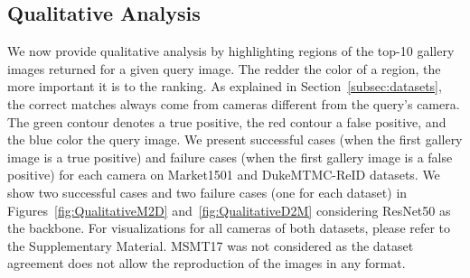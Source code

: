 \documentclass[journal]{IEEEtran}
\begin{document}
\subsection{Qualitative Analysis}

We now provide qualitative analysis by highlighting regions of the top-10 gallery images returned for a given query image. The redder the color of a region, the more important it is to the ranking. As explained in Section~\ref{subsec:datasets}, the correct matches always come from cameras different from the query’s camera. The green contour denotes a true positive, the red contour a false positive, and the blue color the query image. We present successful cases (when the first gallery image is a true positive) and failure cases (when the first gallery image is a false positive) for each camera on Market1501 and DukeMTMC-ReID datasets. We show two successful cases and two failure cases (one for each dataset) in Figures~\ref{fig:QualitativeM2D} and~\ref{fig:QualitativeD2M} considering ResNet50 as the backbone. For visualizations for all cameras of both datasets, please refer to the Supplementary Material. MSMT17 was not considered as the dataset agreement does not allow the reproduction of the images in any format.

\begin{figure*}[ht]
\centering
{}
\hfil
{}
\caption{The most activated regions in the gallery image given a query on DukeMTMCReID (Market $\rightarrow$ Duke scenario) for ResNet50. (a) Successful match; (b) Failure case.}
\label{fig:QualitativeM2D}
\end{figure*}

\begin{figure*}[ht]
\centering
{}
\caption{Highlighting image regions most activated on gallery image given query on Market1501 after run Duke $\rightarrow$ Market scenario on ResNet50. (a) Successful match; (b) Failure case.}
\label{fig:QualitativeD2M}
\end{figure*}
\end{document}
